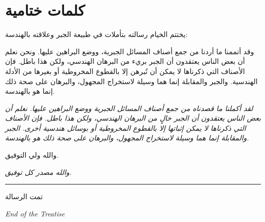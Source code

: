 \documentclass[11pt,a4paper]{book}
\newcommand{\ar}[1]{\leavevmode\arabicfont\beginR #1\endR}
\newcommand{\arLarge}[1]{{\Large\leavevmode\arabicfont\beginR #1\endR}}
\newenvironment{propbox}[1][]
  {\def\propboxtitle{#1}%
   \begin{snugshade}%
   \ifx\propboxtitle\empty\else
     \noindent{\bfseries\arabicfontbold\beginR #1\endR}\par\vspace{2pt}
   \fi}
  {\end{snugshade}}
\begin{document}
\clearpage

\section{\ar{كلمات ختامية}}

\ar{يختتم الخيام رسالته بتأملات في طبيعة الجبر وعلاقته بالهندسة:}

\begin{propbox}[]
\ar{وقد أتممنا ما أردنا من جمع أصناف المسائل الجبرية، ووضع البراهين عليها. ونحن نعلم أن بعض الناس يعتقدون أن الجبر بريء من البرهان الهندسي، ولكن هذا باطل. فإن الأصناف التي ذكرناها لا يمكن أن تُبرهن إلا بالقطوع المخروطية أو بغيرها من الأدلة الهندسية. والجبر والمقابلة إنما هما وسيلة لاستخراج المجهول، والبرهان على صحة ذلك إنما هو بالهندسة.}

\vspace{0.3cm}

\textit{لقد أكملنا ما قصدناه من جمع أصناف المسائل الجبرية ووضع البراهين عليها. نعلم أن بعض الناس يعتقدون أن الجبر خالٍ من البرهان الهندسي، ولكن هذا باطل. فإن الأصناف التي ذكرناها لا يمكن إثباتها إلا بالقطوع المخروطية أو بوسائل هندسية أخرى. الجبر والمقابلة إنما هما وسيلة لاستخراج المجهول، والبرهان على صحة ذلك هو بالهندسة.}
\end{propbox}

\vspace{0.5cm}

\begin{center}
{\arLarge{والله ولي التوفيق.}}

\vspace{0.3cm}

\textit{والله مصدر كل توفيق.}
\end{center}

\vspace{1cm}

\begin{center}
{\color{rulecolor}\rule{0.6\textwidth}{0.8pt}}

\vspace{0.5cm}

{\arLarge{تمت الرسالة}}

\vspace{0.3cm}

{\small\textit{End of the Treatise}}
\end{center}

\clearpage
\end{document}
